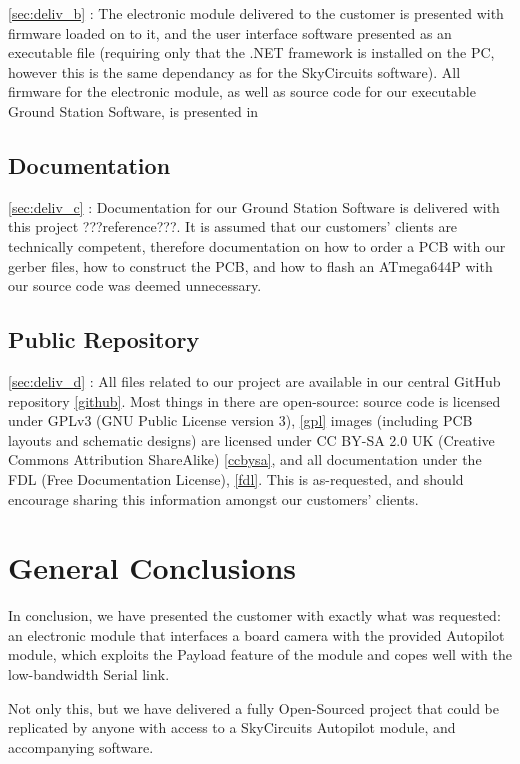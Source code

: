 \ref{sec:deliv_b} : The electronic module delivered to the customer is 
presented with firmware loaded on to it, and the user interface software 
presented as an executable file (requiring only that the .NET framework 
is installed on the PC, however this is the same dependancy as for the 
SkyCircuits software). All firmware for the electronic module, as well as 
source code for our executable Ground Station Software, is presented in 

\subsection{Documentation}

\ref{sec:deliv_c} : Documentation for our Ground Station Software is 
delivered with this project ???reference???. It is assumed that our customers' clients are technically competent, therefore documentation on 
how to order a PCB with our gerber files, how to construct the PCB, and how 
to flash an ATmega644P with our source code was deemed unnecessary.

\subsection{Public Repository}

\ref{sec:deliv_d} : All files related to our project are available in our 
central GitHub repository \ref{github}. Most things in there are open-source: source code is licensed under GPLv3 (GNU Public License version 3), 
\ref{gpl}
images (including PCB layouts and schematic designs) are licensed under 
CC BY-SA 2.0 UK (Creative Commons Attribution ShareAlike) \ref{ccbysa}, 
and all documentation under the FDL (Free Documentation License), \ref{fdl}. This is as-requested, and should encourage sharing this information 
amongst our customers' clients.

\section{General Conclusions}

In conclusion, we have presented the customer with exactly what was requested: 
an electronic module that interfaces a board camera with the provided Autopilot 
module, which exploits the Payload feature of the module and copes well with 
the low-bandwidth Serial link.

Not only this, but we have delivered a fully Open-Sourced project that could 
be replicated by anyone with access to a SkyCircuits Autopilot module, and 
accompanying software.

